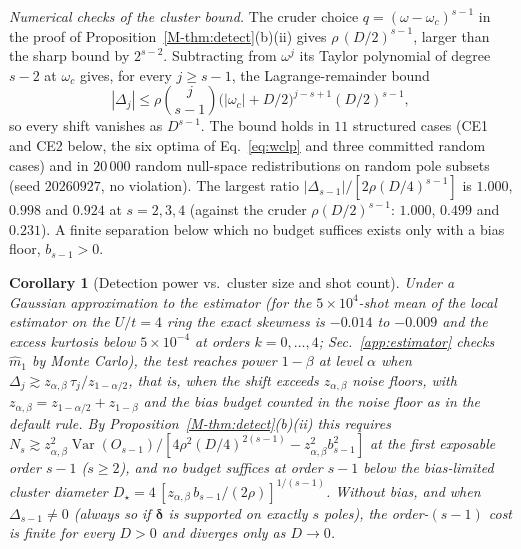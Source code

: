 \documentclass[aps,prb,onecolumn,superscriptaddress,longbibliography,floatfix]{revtex4-2}
\newtheorem{corollary}{Corollary}
\begin{document}
\emph{Numerical checks of the cluster bound.} The cruder choice $q=(\omega-\omega_c)^{s-1}$ in the proof of Proposition~\ref{M-thm:detect}(b)(ii) gives $\rho\,(D/2)^{s-1}$, larger than the sharp bound by $2^{s-2}$. Subtracting from $\omega^j$ its Taylor polynomial of degree $s-2$ at $\omega_c$ gives, for every ${j\ge s-1}$, the Lagrange-remainder bound
\[
|\Delta_j|\le\rho\binom{j}{s-1}\big(|\omega_c|+D/2\big)^{j-s+1}(D/2)^{s-1},
\]
so every shift vanishes as $D^{s-1}$. The bound holds in $11$ structured cases (CE1 and CE2 below, the six optima of Eq.~\eqref{eq:wclp} and three committed random cases) and in $20\,000$ random null-space redistributions on random pole subsets (seed $20260927$, no violation). The largest ratio $|\Delta_{s-1}|/[2\rho(D/4)^{s-1}]$ is $1.000$, $0.998$ and $0.924$ at $s=2,3,4$ (against the cruder $\rho(D/2)^{s-1}$: $1.000$, $0.499$ and $0.231$). A finite separation below which no budget suffices exists only with a bias floor, $b_{s-1}>0$.

\begin{corollary}[Detection power vs.\ cluster size and shot count]
\label{cor:power}
Under a Gaussian approximation to the estimator (for the $5\times10^4$-shot mean of the local estimator on the $U/t=4$ ring the exact skewness is $-0.014$ to $-0.009$ and the excess kurtosis below $5\times10^{-4}$ at orders $k=0,\dots,4$; Sec.~\ref{app:estimator} checks $\widehat m_1$ by Monte Carlo), the test reaches power $1-\beta$ at level $\alpha$ when $\Delta_j\gtrsim z_{\alpha,\beta}\,\tau_j/z_{1-\alpha/2}$, that is, when the shift exceeds $z_{\alpha,\beta}$ noise floors, with $z_{\alpha,\beta}=z_{1-\alpha/2}+z_{1-\beta}$ and the bias budget counted in the noise floor as in the default rule. By Proposition~\ref{M-thm:detect}(b)(ii) this requires $N_s\gtrsim z_{\alpha,\beta}^2\operatorname{Var}(O_{s-1})/[4\rho^2(D/4)^{2(s-1)}-z_{\alpha,\beta}^2 b_{s-1}^2]$ at the first exposable order $s-1$ ($s\ge2$), and no budget suffices at order $s-1$ below the bias-limited cluster diameter $D_\star=4\,[z_{\alpha,\beta}\,b_{s-1}/(2\rho)]^{1/(s-1)}$. Without bias, and when $\Delta_{s-1}\neq0$ (always so if $\bm\delta$ is supported on exactly $s$ poles), the order-$(s-1)$ cost is finite for every $D>0$ and diverges only as $D\to0$.
\end{corollary}
\end{document}
